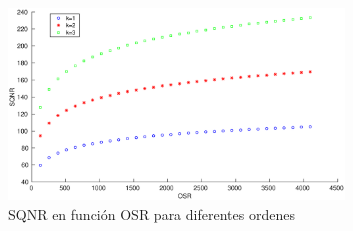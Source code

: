 \documentclass[a4paper,conference]{IEEEtran}
\begin{document}
\begin{figure}[!t]
\centering
\includegraphics[height=2in]{SQNR_ideal_segun_OSR}
%
\caption{SQNR en funci\'on OSR para diferentes ordenes}
\label{fig:SQNR}
\end{figure}


%
%

\end{document}
